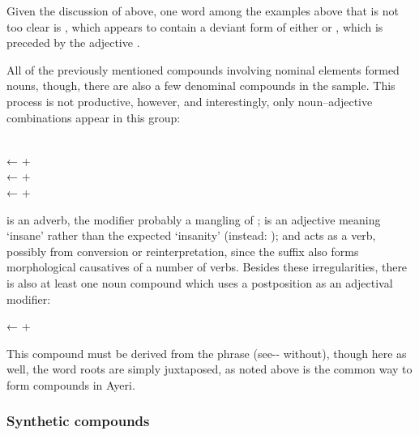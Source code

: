Given the discussion of  above, one word among the examples
above that is not too clear is , which appears to
contain a deviant form of either  or
, which is preceded by the adjective 
.

All of the previously mentioned compounds involving nominal elements formed 
nouns, though, there are also a few denominal compounds in the sample. This 
process is not productive, however, and interestingly, only noun–adjective 
combinations appear in this group:

\pex
	\a {} \\
		← 
		+ \ques{}\,
	\a {} \\
		← 
		+ 
	\a {} \\
		← 
		+ 
\xe

 is an adverb, the modifier probably a mangling of 
;  is an adjective meaning `insane' 
rather than the expected `insanity' (instead: );
and  acts as a verb, possibly from conversion or
reinterpretation, since the suffix  also forms morphological
causatives of a number of verbs. Besides these irregularities, there is also at
least one noun compound which uses a postposition as an adjectival modifier:

\ex
	← 
	+ 
\xe

This compound must be derived from the phrase  (see-\Nmlz{}-\Loc{} without), though here as well, the 
word roots are simply juxtaposed, as noted above is the common way to form 
compounds in Ayeri.


\subsubsection{Synthetic compounds}

